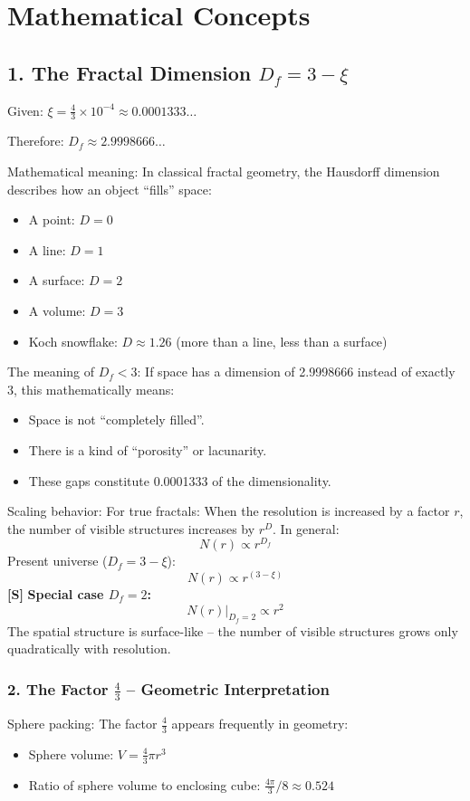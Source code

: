 	\section{Mathematical Concepts}
	
	\subsection{1. The Fractal Dimension \( D_f = 3 - \xi \)}
	Given: \( \xi = \frac{4}{3} \times 10^{-4} \approx 0.0001333\ldots \)
	
	Therefore: \( D_f \approx 2.9998666\ldots \)
	
	Mathematical meaning:
	In classical fractal geometry, the Hausdorff dimension describes how an object ``fills'' space:
	\begin{itemize}
		\item A point: \( D = 0 \)
		\item A line: \( D = 1 \)
		\item A surface: \( D = 2 \)
		\item A volume: \( D = 3 \)
		\item Koch snowflake: \( D \approx 1.26 \) (more than a line, less than a surface)
	\end{itemize}
	
	The meaning of \( D_f < 3 \):
	If space has a dimension of 2.9998666 instead of exactly 3, this mathematically means:
	\begin{itemize}
		\item Space is not ``completely filled''.
		\item There is a kind of ``porosity'' or lacunarity.
		\item These gaps constitute 0.0001333 of the dimensionality.
	\end{itemize}
	
	Scaling behavior:
	For true fractals: When the resolution is increased by a factor \( r \), the number of visible structures increases by \( r^D \). In general:
	\[
	N(r) \propto r^{D_f}
	\]
	Present universe (\( D_f = 3 - \xi \)):
	\[
	N(r) \propto r^{(3-\xi)}
	\]
	\textbf{[S]} \textbf{Special case \(D_f = 2\):}
	\[
	N(r)\big|_{D_f=2} \propto r^{2}
	\]
	The spatial structure is surface-like -- the number of visible structures grows only quadratically with resolution.
	
	\subsubsection{2. The Factor \( \frac{4}{3} \) – Geometric Interpretation}
	Sphere packing:
	The factor \( \frac{4}{3} \) appears frequently in geometry:
	\begin{itemize}
		\item Sphere volume: \( V = \frac{4}{3}\pi r^3 \)
		\item Ratio of sphere volume to enclosing cube: \( \frac{4\pi}{3}/8 \approx 0.524 \)
	\end{itemize}
	
